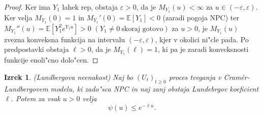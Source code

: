 \documentclass[12pt, a4paper, reqno]{amsart}
\theoremstyle{definition}
\theoremstyle{plain}
\newtheorem{izrek}[definicija]{Izrek}
\newcommand{\E}{\mathbb{E}}
\newcommand{\1}{\mathds{1}}
\begin{document}
            \begin{proof}
                Ker ima $Y_1$ lahek rep, obstaja $\varepsilon > 0$, da je $M_{Y_1}(u) < \infty$ za $u\in(-\varepsilon, \varepsilon)$.
                Ker velja $M_{Y_1}(0) = 1$ in $M_{Y_1}'(0) = \E\left[Y_1\right] < 0$ (zaradi pogoja NPC) ter
                $M_{Y_1}''(u) = \E\left[Y_1^2e^{Y_1u}\right] > 0$ $(Y_1 \neq 0 \ \text{skoraj gotovo})$ za 
                $u>0$, je $M_{Y_1}(u)$ zvezna konveksna funkcija na intervalu $(-\varepsilon, \varepsilon)$, kjer 
                v okolici ni"cle pada. Po predpostavki obstaja $\ell > 0$, da je $M_{Y_1}(\ell) = 1$, ki pa
                je zaradi konveksnosti funkcije enoli"cno dolo"cen.
            \end{proof}

            \begin{izrek}(Lundbergova neenakost)
                Naj bo $(U_t)_{t\geq0}$ proces tveganja v Cramér-Lundbergovem modelu, ki zado"sca NPC in 
                naj zanj obstaja Lundebrgov koeficient $\ell$. Potem za vsak $u>0$ velja
                \begin{equation*}
                    \psi(u) \leq e^{-\ell u}.
                \end{equation*}
                \label{izr:LundbergovaNeenakost}
            \end{izrek}
\end{document}

